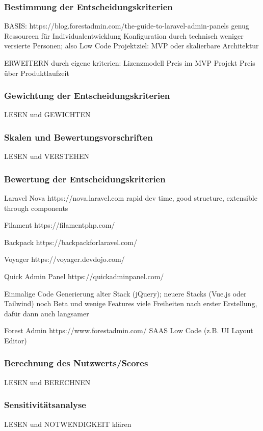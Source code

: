 \subsubsection{Bestimmung der Entscheidungskriterien}
BASIS: https://blog.forestadmin.com/the-guide-to-laravel-admin-panels
genug Ressourcen für Individualentwicklung
Konfiguration durch technisch weniger versierte Personen; also Low Code
Projektziel: MVP oder skalierbare Architektur

ERWEITERN durch eigene kriterien:
Lizenzmodell
Preis im MVP Projekt
Preis über Produktlaufzeit

\subsubsection{Gewichtung der Entscheidungskriterien}
LESEN und GEWICHTEN

\subsubsection{Skalen und Bewertungsvorschriften}
LESEN und VERSTEHEN

\subsubsection{Bewertung der Entscheidungskriterien}
Laravel Nova
https://nova.laravel.com
rapid dev time, good structure, extensible through components

Filament
https://filamentphp.com/

Backpack
https://backpackforlaravel.com/

Voyager
https://voyager.devdojo.com/

Quick Admin Panel
https://quickadminpanel.com/

Einmalige Code Generierung
alter Stack (jQuery); neuere Stacks (Vue.js oder Tailwind) noch Beta und wenige Features
viele Freiheiten nach erster Erstellung, dafür dann auch langsamer

Forest Admin
https://www.forestadmin.com/
SAAS
Low Code (z.B. UI Layout Editor)

\subsubsection{Berechnung des Nutzwerts/Scores}
LESEN und BERECHNEN

\subsubsection{Sensitivitätsanalyse}
LESEN und NOTWENDIGKEIT klären
